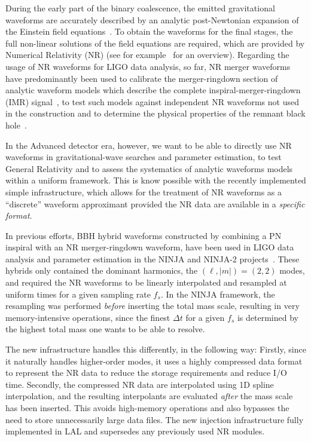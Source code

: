 \documentclass[aps,prd,amssymb,amsmath,amsfonts,superscriptaddress,
floatfix ,preprintnumbers,altaffilletter]{revtex4}
\begin{document}
During the early part of the binary coalescence, the emitted gravitational waveforms are accurately described by an
analytic post-Newtonian expansion of the Einstein field equations~\cite{lrr-2014-2}. 
To obtain the waveforms for the final stages, the full non-linear solutions
of the field equations are required, which are provided by Numerical Relativity (NR) (see for example~\cite{Centrella:2010mx} for an overview).
Regarding the usage of NR waveforms for LIGO data analysis, so far, NR merger waveforms have predominantly been used to calibrate the merger-ringdown section of analytic waveform models which describe the complete inspiral-merger-ringdown (IMR) signal~\cite{Khan:2015jqa, Taracchini:2013rva}, to test such models against independent NR waveforms not used in the construction and to determine the physical properties of the remnant black hole~\cite{Healy:2014yta}.

In the Advanced detector era, however, we want to be able to directly use NR waveforms in gravitational-wave searches
and parameter estimation, to test General Relativity and to assess the systematics of analytic waveforms models within
a uniform framework. 
This is know possible with the recently implemented  simple infrastructure, which allows for the treatment of
NR waveforms as a ``discrete'' waveform approximant provided the NR data are available in a \emph{specific format}. 

In previous efforts, BBH hybrid waveforms constructed by combining a PN inspiral with an NR merger-ringdown 
waveform, have been used in LIGO data analysis and parameter estimation in the NINJA and NINJA-2 projects~\cite{Aylott:2009ya, Aasi:2014tra}. These hybrids only contained the dominant harmonics, the $(\ell, |m|) =(2,2)$ modes, and required the NR waveforms to be linearly interpolated and resampled at uniform times for a given sampling rate $f_s$. In the NINJA framework, the resampling was performed 
 \emph{before} inserting the total mass scale, resulting in very memory-intensive operations, since the finest $\Delta t$ for a given $f_s$ is determined by the highest total mass one wants to be able to resolve.
  
The new infrastructure handles this differently, in the following way: Firstly, since it naturally handles higher-order modes, it uses a highly compressed data format to represent the NR data to reduce the storage requirements and reduce I/O time. 
Secondly, the compressed NR data are interpolated using 1D spline interpolation, and the resulting interpolants are evaluated \emph{after} the mass scale has been inserted. This avoids high-memory operations and also bypasses the need to store unnecessarily large data files.
The new injection infrastructure fully implemented in LAL and supersedes any previously used NR modules.
\end{document}
